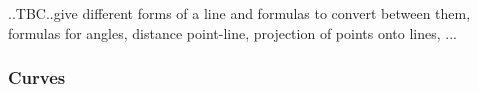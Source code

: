 


..TBC..give different forms of a line and formulas to convert between them, formulas for angles, distance point-line, projection of points onto lines, ...



%



\subsubsection{Curves}

